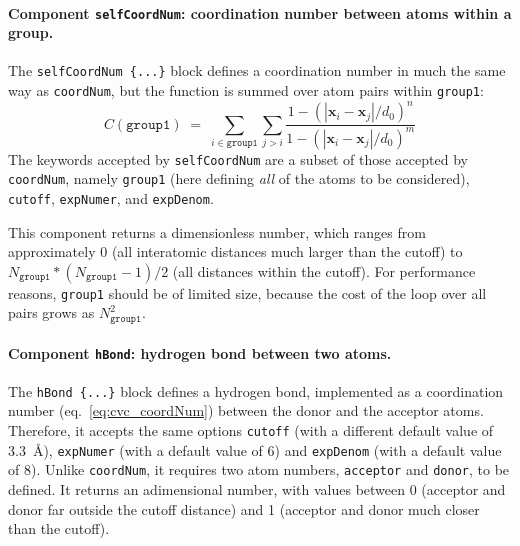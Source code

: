 \paragraph*{Component \texttt{selfCoordNum}: coordination number
  between atoms within a group.}  The \texttt{selfCoordNum \{...\}} block defines
a coordination number in much the same way as \texttt{coordNum},
but the function is summed over atom pairs within \texttt{group1}:
\begin{equation}
  \label{eq:cvc_selfCoordNum}
  C (\mathtt{group1}) \; = \; 
  \sum_{i\in\mathtt{group1}}\sum_{j > i} {
    \frac{1 - (|\mathbf{x}_{i}-\mathbf{x}_{j}|/d_{0})^{n}}{
      1 - (|\mathbf{x}_{i}-\mathbf{x}_{j}|/d_{0})^{m} }
  }
\end{equation}
The keywords accepted by \texttt{selfCoordNum} are a subset of
those accepted by \texttt{coordNum}, namely \texttt{group1}
(here defining \emph{all} of the atoms to be considered),
\texttt{cutoff}, \texttt{expNumer}, and \texttt{expDenom}.

This component returns a dimensionless number, which ranges from
approximately 0 (all interatomic distances much larger than the
cutoff) to $N_{\mathtt{group1}} * (N_{\mathtt{group1}} - 1) / 2$ (all
distances within the cutoff).  For performance reasons,
\texttt{group1} should be of limited size, because the cost of the
loop over all pairs grows as $N_{\mathtt{group1}}^2$.



\paragraph*{Component \texttt{hBond}: hydrogen bond between two
  atoms.}  The \texttt{hBond \{...\}} block defines a hydrogen
bond, implemented as a coordination number (eq.~\ref{eq:cvc_coordNum})
between the donor and the acceptor atoms.  Therefore, it accepts the
same options \texttt{cutoff} (with a different default value of
3.3~\AA{}), \texttt{expNumer} (with a default value of 6) and
\texttt{expDenom} (with a default value of 8).  Unlike
\texttt{coordNum}, it requires two atom numbers, \texttt{acceptor} and
\texttt{donor}, to be defined.  It returns an adimensional number,
with values between 0 (acceptor and donor far outside the cutoff
distance) and 1 (acceptor and donor much closer than the cutoff).


